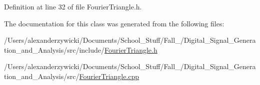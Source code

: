 Definition at line 32 of file Fourier\+Triangle.\+h.



The documentation for this class was generated from the following files\+:\begin{DoxyCompactItemize}
\item 
/\+Users/alexanderzywicki/\+Documents/\+School\+\_\+\+Stuff/\+Fall\+\_/\+Digital\+\_\+\+Signal\+\_\+\+Generation\+\_\+and\+\_\+\+Analysis/src/include/\hyperlink{FourierTriangle_8h}{Fourier\+Triangle.\+h}\item 
/\+Users/alexanderzywicki/\+Documents/\+School\+\_\+\+Stuff/\+Fall\+\_/\+Digital\+\_\+\+Signal\+\_\+\+Generation\+\_\+and\+\_\+\+Analysis/src/\hyperlink{FourierTriangle_8cpp}{Fourier\+Triangle.\+cpp}\end{DoxyCompactItemize}
